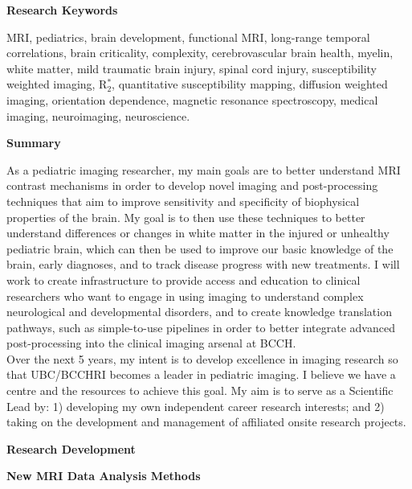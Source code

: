 \documentclass[11pt,notitlepage,english]{report}
\begin{document}
\noindent \textbf{Research Keywords}

\noindent MRI, pediatrics, brain development, functional MRI, long-range temporal correlations, brain criticality, complexity, cerebrovascular brain health, myelin, white matter, mild traumatic brain injury, spinal cord injury, susceptibility weighted imaging, R$_{2}^{*}$, quantitative susceptibility mapping, diffusion weighted imaging, orientation dependence, magnetic resonance spectroscopy, medical imaging, neuroimaging, neuroscience.

\vspace{5pt}

\noindent \textbf{Summary}


As a pediatric imaging researcher, my main goals are to better understand MRI contrast mechanisms in order to develop novel imaging and post-processing techniques that aim to improve sensitivity and specificity of biophysical properties of the brain. My goal is to then use these techniques to better understand differences or changes in white matter in the injured or unhealthy pediatric brain, which can then be used to improve our basic knowledge of the brain, early diagnoses, and to track disease progress with new treatments. I will work to create infrastructure to provide access and education to clinical researchers who want to engage in using imaging to understand complex neurological and developmental disorders, and to create knowledge translation pathways, such as simple-to-use pipelines in order to better integrate advanced post-processing into the clinical imaging arsenal at BCCH.
\\

Over the next 5 years, my intent is to develop excellence in imaging research so that UBC/BCCHRI becomes a leader in pediatric imaging. I believe we have a centre and the resources to achieve this goal. My aim is to serve as a Scientific Lead by: 1) developing my own independent career research interests; and 2) taking on the development and management of affiliated onsite research projects.

\vspace{5pt}

\noindent \textbf{Research Development}

\noindent \textbf{New MRI Data Analysis Methods}
\end{document}
